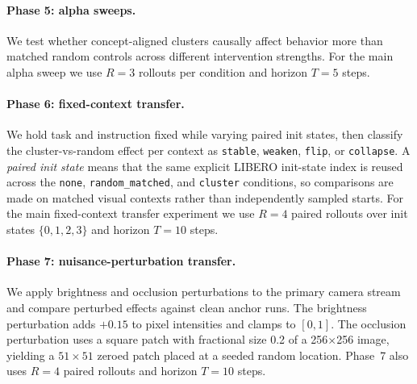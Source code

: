 \documentclass[11pt]{article}
\begin{document}
\paragraph{Phase 5: alpha sweeps.}
We test whether concept-aligned clusters causally affect behavior more than matched random controls across different intervention strengths. For the main alpha sweep we use $R=3$ rollouts per condition and horizon $T=5$ steps.

\paragraph{Phase 6: fixed-context transfer.}
We hold task and instruction fixed while varying paired init states, then classify the cluster-vs-random effect per context as \texttt{stable}, \texttt{weaken}, \texttt{flip}, or \texttt{collapse}. A \emph{paired init state} means that the same explicit LIBERO init-state index is reused across the \texttt{none}, \texttt{random\_matched}, and \texttt{cluster} conditions, so comparisons are made on matched visual contexts rather than independently sampled starts. For the main fixed-context transfer experiment we use $R=4$ paired rollouts over init states $\{0,1,2,3\}$ and horizon $T=10$ steps.

\paragraph{Phase 7: nuisance-perturbation transfer.}
We apply brightness and occlusion perturbations to the primary camera stream and compare perturbed effects against clean anchor runs. The brightness perturbation adds $+0.15$ to pixel intensities and clamps to $[0,1]$. The occlusion perturbation uses a square patch with fractional size 0.2 of a 256$\times$256 image, yielding a $51\times51$ zeroed patch placed at a seeded random location. Phase~7 also uses $R=4$ paired rollouts and horizon $T=10$ steps.
\end{document}
